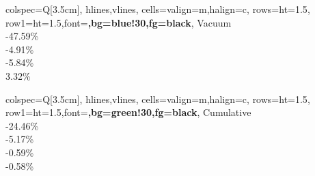 \documentclass{article}
\begin{document}
\begin{center}
\begin{minipage}[t]{3.5cm}
\begin{tblr}{
				colspec={Q[3.5cm]},
				hlines,vlines,
				cells={valign=m,halign=c},
				rows={ht=1.5\baselineskip},
				row{1}={ht=1.5\baselineskip,font=\bfseries,bg=blue!30,fg=black},
			}
			Vacuum \\
			{-47.59\%} \\
			{-4.91\%} \\
			{-5.84\%} \\ 
			{3.32\%} \\ 
		\end{tblr}
	\end{minipage}
	\hspace{1em}
	\begin{minipage}[t]{3.5cm}
		\centering
		\begin{tblr}{
				colspec={Q[3.5cm]},
				hlines,vlines,
				cells={valign=m,halign=c},
				rows={ht=1.5\baselineskip},
				row{1}={ht=1.5\baselineskip,font=\bfseries,bg=green!30,fg=black},
			}
			Cumulative \\
			{-24.46\%} \\
			{-5.17\%} \\
			{-0.59\%} \\
			{-0.58\%} \
		\end{tblr}
	\end{minipage}	
\end{center}
\label{table:Percenterrors}
\vspace{1em}
\end{document}
